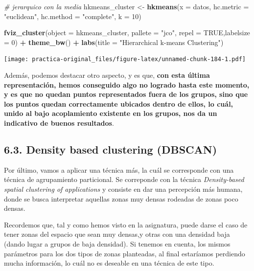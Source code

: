 \documentclass[spanish,]{article}
\newenvironment{Shaded}{\begin{snugshade}}{\end{snugshade}}
\newcommand{\KeywordTok}[1]{\textcolor[rgb]{0.13,0.29,0.53}{\textbf{#1}}}
\newcommand{\DataTypeTok}[1]{\textcolor[rgb]{0.13,0.29,0.53}{#1}}
\newcommand{\DecValTok}[1]{\textcolor[rgb]{0.00,0.00,0.81}{#1}}
\newcommand{\StringTok}[1]{\textcolor[rgb]{0.31,0.60,0.02}{#1}}
\newcommand{\CommentTok}[1]{\textcolor[rgb]{0.56,0.35,0.01}{\textit{#1}}}
\newcommand{\OtherTok}[1]{\textcolor[rgb]{0.56,0.35,0.01}{#1}}
\newcommand{\OperatorTok}[1]{\textcolor[rgb]{0.81,0.36,0.00}{\textbf{#1}}}
\newcommand{\NormalTok}[1]{#1}
\begin{document}
\begin{Shaded}
\begin{Highlighting}[]
\CommentTok{# jerarquico con la media}
\NormalTok{hkmeans_cluster <-}\StringTok{ }\KeywordTok{hkmeans}\NormalTok{(}\DataTypeTok{x =}\NormalTok{ datos, }\DataTypeTok{hc.metric =} \StringTok{"euclidean"}\NormalTok{,}
                           \DataTypeTok{hc.method =} \StringTok{"complete"}\NormalTok{, }\DataTypeTok{k =} \DecValTok{10}\NormalTok{)}

\KeywordTok{fviz_cluster}\NormalTok{(}\DataTypeTok{object =}\NormalTok{ hkmeans_cluster, }\DataTypeTok{pallete =} \StringTok{"jco"}\NormalTok{, }\DataTypeTok{repel =} \OtherTok{TRUE}\NormalTok{,}\DataTypeTok{labelsize =} \DecValTok{0}\NormalTok{) }\OperatorTok{+}
\StringTok{  }\KeywordTok{theme_bw}\NormalTok{() }\OperatorTok{+}\StringTok{ }\KeywordTok{labs}\NormalTok{(}\DataTypeTok{title =} \StringTok{"Hierarchical k-means Clustering"}\NormalTok{)}
\end{Highlighting}
\end{Shaded}

\texttt{[image: practica-original\_files/figure-latex/unnamed-chunk-184-1.pdf]}

Además, podemos destacar otro aspecto, y es que, \textbf{con esta última
representación, hemos conseguido algo no logrado hasta este momento, y
es que no quedan puntos representados fuera de los grupos, sino que los
puntos quedan correctamente ubicados dentro de ellos, lo cuál, unido al
bajo acoplamiento existente en los grupos, nos da un indicativo de
buenos resultados}.

\subsection{6.3. Density based clustering
(DBSCAN)}\label{density-based-clustering-dbscan}

Por último, vamos a aplicar una técnica más, la cuál se corresponde con
una técnica de agrupamiento particional. Se correponde con la técnica
\emph{Density-based spatial clustering of applications} y consiste en
dar una percepción más humana, donde se busca interpretar aquellas zonas
muy densas rodeadas de zonas poco densas.

Recordemos que, tal y como hemos visto en la asignatura, puede darse el
caso de tener zonas del espacio que sean muy densas,y otras con una
densidad baja (dando lugar a grupos de baja densidad). Si tenemos en
cuenta, los mismos parámetros para los dos tipos de zonas planteadas, al
final estaríamos perdiendo mucha información, lo cuál no es deseable en
una técnica de este tipo.
\end{document}
